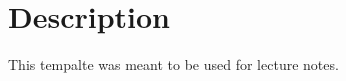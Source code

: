 \documentclass{article}
\begin{document}
\section{Description}
This tempalte was meant to be used for lecture notes.
\end{document}
